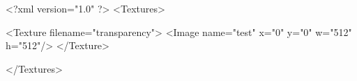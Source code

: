 <?xml version="1.0" ?>
<Textures>

	<Texture filename="transparency">
		<Image name="test" x="0" y="0" w="512" h="512"/>
    </Texture>

</Textures>

